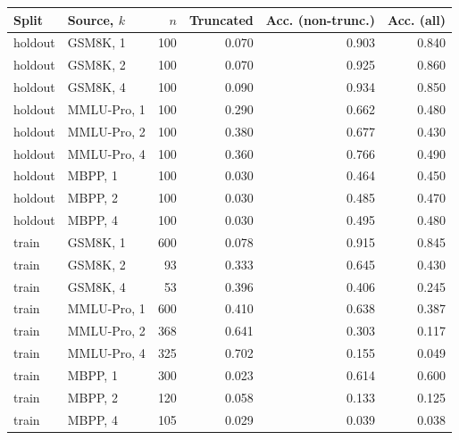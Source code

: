 \begin{tabular}{llrrrr}
\toprule
Split & Source, $k$ & $n$ & Truncated & Acc. (non-trunc.) & Acc. (all) \\
\midrule
holdout & GSM8K, 1 & 100 & 0.070 & 0.903 & 0.840 \\
holdout & GSM8K, 2 & 100 & 0.070 & 0.925 & 0.860 \\
holdout & GSM8K, 4 & 100 & 0.090 & 0.934 & 0.850 \\
holdout & MMLU-Pro, 1 & 100 & 0.290 & 0.662 & 0.480 \\
holdout & MMLU-Pro, 2 & 100 & 0.380 & 0.677 & 0.430 \\
holdout & MMLU-Pro, 4 & 100 & 0.360 & 0.766 & 0.490 \\
holdout & MBPP, 1 & 100 & 0.030 & 0.464 & 0.450 \\
holdout & MBPP, 2 & 100 & 0.030 & 0.485 & 0.470 \\
holdout & MBPP, 4 & 100 & 0.030 & 0.495 & 0.480 \\
train & GSM8K, 1 & 600 & 0.078 & 0.915 & 0.845 \\
train & GSM8K, 2 & 93 & 0.333 & 0.645 & 0.430 \\
train & GSM8K, 4 & 53 & 0.396 & 0.406 & 0.245 \\
train & MMLU-Pro, 1 & 600 & 0.410 & 0.638 & 0.387 \\
train & MMLU-Pro, 2 & 368 & 0.641 & 0.303 & 0.117 \\
train & MMLU-Pro, 4 & 325 & 0.702 & 0.155 & 0.049 \\
train & MBPP, 1 & 300 & 0.023 & 0.614 & 0.600 \\
train & MBPP, 2 & 120 & 0.058 & 0.133 & 0.125 \\
train & MBPP, 4 & 105 & 0.029 & 0.039 & 0.038 \\
\bottomrule
\end{tabular}
